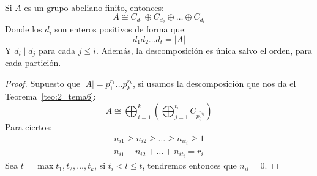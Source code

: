 \begin{teo}\label{teo:3_tema6}\ \\
    Si $A$ es un grupo abeliano finito, entonces:
    \begin{equation*}
        A\cong C_{d_1} \oplus C_{d_2} \oplus \ldots \oplus C_{d_t}
    \end{equation*}
    Donde los $d_i$ son enteros positivos de forma que:
    \begin{equation*}
        d_1d_2\ldots d_t = |A|
    \end{equation*}
    Y $d_i \mid d_j$ para cada $j \leq i$. Además, la descomposición es única salvo el orden, para cada partición.
    \begin{proof}
        Supuesto que $|A| = p_1^{r_1}\ldots p_k^{r_k}$, si usamos la descomposición que nos da el Teorema~\ref{teo:2_tema6}:
        \begin{equation*}
            A \cong \bigoplus_{i=1}^k \left(\bigoplus_{j=1}^{t_i} C_{p_i^{n_{ij}}}\right)
        \end{equation*}
        Para ciertos:
        \begin{align*}
            n_{i1} \geq n_{i2} \geq \ldots \geq n_{it_{i}} \geq 1 \\
            n_{i1} + n_{i2} + \ldots + n_{it_{i}} = r_i
        \end{align*}
        Sea $t = \max{t_1, t_2, \ldots, t_k}$, si $t_i < l \leq t$, tendremos entonces que $n_{il} = 0$.


\end{proof}
\end{teo}
